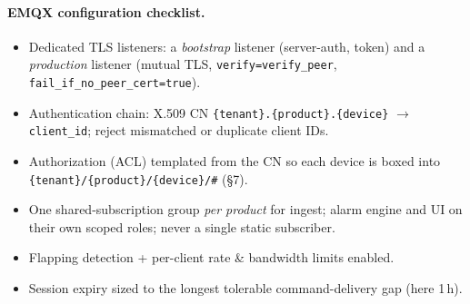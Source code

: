 \documentclass[11pt,a4paper]{article}
\begin{document}
\paragraph{EMQX configuration checklist.}
\begin{itemize}[leftmargin=1.4em,itemsep=1pt]
  \item Dedicated TLS listeners: a \emph{bootstrap} listener (server-auth, token) and a
        \emph{production} listener (mutual TLS, \texttt{verify=verify\_peer},
        \texttt{fail\_if\_no\_peer\_cert=true}).
  \item Authentication chain: X.509 CN \texttt{\{tenant\}.\{product\}.\{device\}}
        $\rightarrow$ \texttt{client\_id}; reject mismatched or duplicate client IDs.
  \item Authorization (ACL) templated from the CN so each device is boxed into
        \texttt{\{tenant\}/\allowbreak\{product\}/\allowbreak\{device\}/\#} (\S7).
  \item One shared-subscription group \emph{per product} for ingest; alarm engine and UI on
        their own scoped roles; never a single static subscriber.
  \item Flapping detection + per-client rate \& bandwidth limits enabled.
  \item Session expiry sized to the longest tolerable command-delivery gap (here 1\,h).
\end{itemize}


\end{document}
